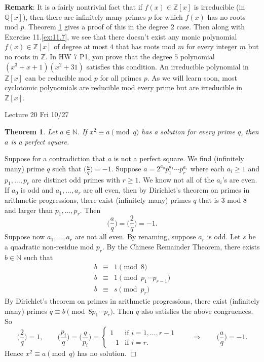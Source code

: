 \documentclass{article}
\def\Z{{\mathbb Z}}
\def\N{{\mathbb N}}
\def\Q{{\mathbb Q}}
\def\Z{{\mathbb Z}}
\def\Q{{\mathbb Q}}
\def\v{{\vspace{5pt}}}
\newtheorem{theorem}[subsection]{Theorem}
\newenvironment{proof}{\noindent {\bf Proof:}}{$\Box$ \vspace{2 ex}}
\newcommand{\add}[1]{{\color{blue} #1}}
\renewcommand{\lg}[2]{\Big(\frac{#1}{#2}\Big)}
\begin{document}
\v
\noindent\textbf{Remark}: It is a fairly nontrivial fact that if $f(x)\in\Z[x]$ is irreducible (in $\Q[x]$), then there are infinitely many primes $p$ for which $f(x)$ has no roots mod $p$. Theorem \ref{thm:deg2} gives a proof of this in the degree $2$ case. Then along with Exercise 11.\ref{ex:11.7}, we see that there doesn't exist any monic polynomial $f(x)\in\Z[x]$ of degree at most $4$ that has roots mod $m$ for every integer $m$ but no roots in $\Z$. In HW 7 P1, you prove that the degree $5$ polynomial $(x^3 + x + 1)(x^2 + 31)$ satisfies this condition. An irreducible polynomial in $\Z[x]$ can be reducible mod $p$ for all primes $p$. As we will learn soon, most cyclotomic polynomials are reducible mod every prime but are irreducible in $\Z[x]$.

\begin{center}
    \add{Lecture 20 Fri 10/27}
\end{center}

\begin{theorem}\label{thm:deg2}
    Let $a\in\N$. If $x^2 \equiv a\pmod{q}$ has a solution for every prime $q$, then $a$ is a perfect square.
\end{theorem}

\begin{proof}
    Suppose for a contradiction that $a$ is not a perfect square. We find (infinitely many) prime $q$ such that $\lg{a}{q} = -1$. Suppose $a=2^{a_0}p_1^{a_1}\cdots p_r^{a_r}$ where each $a_i\geq1$ and $p_1,\ldots,p_r$ are distinct odd primes with $r\geq 1$. We know not all of the $a_i$'s are even. If $a_0$ is odd and $a_1,\ldots,a_r$ are all even, then by Dirichlet's theorem on primes in arithmetic progressions, there exist (infinitely many) primes $q$ that is $3$ mod $8$ and larger than $p_1,\ldots,p_r$. Then $$\lg{a}{q} = \lg{2}{q} = -1.$$
    Suppose now $a_1,\ldots,a_r$ are not all even. By renaming, suppose $a_r$ is odd. Let $s$ be a quadratic non-residue mod $p_r$. By the Chinese Remainder Theorem, there exists $b\in\N$ such that
    \begin{eqnarray*}
        b&\equiv&1\pmod{8}\\
        b&\equiv&1\pmod{p_1\cdots p_{r-1}}\\
        b&\equiv&s\pmod{p_r}
    \end{eqnarray*}
    By Dirichlet's theorem on primes in arithmetic progressions, there exist (infinitely many) primes $q\equiv b\pmod{8p_1\cdots p_r}$. Then $q$ also satisfies the above congruences. So
    $$\lg{2}{q} = 1,\qquad\lg{p_i}{q} = \lg{q}{p_i} = \begin{cases}
        1&\mbox{if }i=1,\ldots,r-1\\
        -1&\mbox{if }i = r.
    \end{cases}\qquad\Rightarrow\qquad \lg{a}{q} = -1.$$
    Hence $x^2\equiv a\pmod{q}$ has no solution.
\end{proof}
\end{document}
